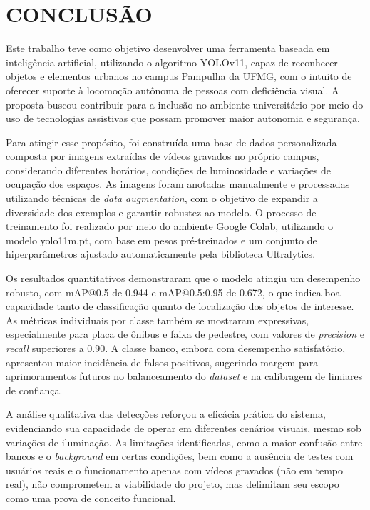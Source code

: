 \chapter{\textbf{CONCLUSÃO}}

Este trabalho teve como objetivo desenvolver uma ferramenta baseada em inteligência artificial, utilizando o algoritmo YOLOv11, capaz de reconhecer objetos e elementos urbanos no campus Pampulha da UFMG, com o intuito de oferecer suporte à locomoção autônoma de pessoas com deficiência visual. A proposta buscou contribuir para a inclusão no ambiente universitário por meio do uso de tecnologias assistivas que possam promover maior autonomia e segurança.

Para atingir esse propósito, foi construída uma base de dados personalizada composta por imagens extraídas de vídeos gravados no próprio campus, considerando diferentes horários, condições de luminosidade e variações de ocupação dos espaços. As imagens foram anotadas manualmente e processadas utilizando técnicas de \textit{data augmentation}, com o objetivo de expandir a diversidade dos exemplos e garantir robustez ao modelo. O processo de treinamento foi realizado por meio do ambiente Google Colab, utilizando o modelo yolo11m.pt, com base em pesos pré-treinados e um conjunto de hiperparâmetros ajustado automaticamente pela biblioteca Ultralytics.

Os resultados quantitativos demonstraram que o modelo atingiu um desempenho robusto, com mAP@0.5 de 0.944 e mAP@0.5:0.95 de 0.672, o que indica boa capacidade tanto de classificação quanto de localização dos objetos de interesse. As métricas individuais por classe também se mostraram expressivas, especialmente para placa de ônibus e faixa de pedestre, com valores de \textit{precision} e \textit{recall} superiores a 0.90. A classe banco, embora com desempenho satisfatório, apresentou maior incidência de falsos positivos, sugerindo margem para aprimoramentos futuros no balanceamento do \textit{dataset} e na calibragem de limiares de confiança.

A análise qualitativa das detecções reforçou a eficácia prática do sistema, evidenciando sua capacidade de operar em diferentes cenários visuais, mesmo sob variações de iluminação. As limitações identificadas, como a maior confusão entre bancos e o \textit{background} em certas condições, bem como a ausência de testes com usuários reais e o funcionamento apenas com vídeos gravados (não em tempo real), não comprometem a viabilidade do projeto, mas delimitam seu escopo como uma prova de conceito funcional.

